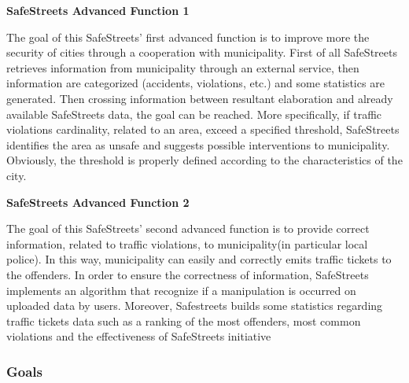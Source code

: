 \documentclass[12pt]{article}
\begin{document}
\begin{flushleft}
\textbf{SafeStreets Advanced Function 1}
\end{flushleft}
\vspace{3mm}
The goal of this SafeStreets’ first advanced function is to improve more the security of cities through a cooperation with municipality. First of all SafeStreets retrieves information from municipality through an external service, then information are categorized (accidents, violations, etc.) and some statistics are generated. Then crossing information between resultant elaboration and already available SafeStreets data, the goal can be reached. More specifically, if traffic violations cardinality, related to an area, exceed a specified threshold, SafeStreets identifies the area as unsafe and suggests possible interventions to municipality. Obviously, the threshold is properly defined according to the characteristics of the city.

\newpage

\begin{flushleft}
\textbf{SafeStreets Advanced Function 2}
\end{flushleft}
\vspace{3mm}
The goal of this SafeStreets’ second advanced function is to provide correct information, related to traffic violations, to municipality(in particular local police). In this way, municipality can easily and correctly emits traffic tickets to the offenders. In order to ensure the correctness of information, SafeStreets implements an algorithm that recognize if a manipulation is occurred on uploaded data by users. Moreover, Safestreets builds some statistics regarding traffic tickets data such as a ranking of the most offenders, most common violations and the effectiveness of SafeStreets initiative
\vspace{4mm}

\subsubsection{Goals}
\end{document}
